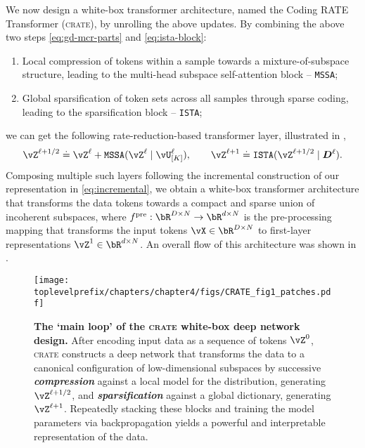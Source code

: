 \documentclass[../../book-main.tex]{subfiles}
\begin{document}
We now design a white-box transformer architecture, named the Coding RATE Transformer (\textsc{crate}), by unrolling the above updates. By combining the above two steps \eqref{eq:gd-mcr-parts} and \eqref{eq:ista-block}:
\begin{enumerate}[leftmargin=0.7cm]
    \item Local compression of tokens within a sample towards a mixture-of-subspace structure, leading to the multi-head subspace self-attention block -- \texttt{MSSA};
    \item Global sparsification of token sets across all samples through sparse coding, leading to the sparsification block -- \texttt{ISTA};
\end{enumerate}
we can get the following rate-reduction-based transformer layer, illustrated in , 
\begin{equation}
    \vZ^{\ell+1/2} \doteq \vZ^{\ell} + \texttt{MSSA}(\vZ^{\ell} \mid \vU_{[K]}^{\ell}), 
    \qquad 
    \vZ^{\ell+1}\doteq \texttt{ISTA}(\vZ^{\ell+1/2} \mid \bm D^\ell).
\end{equation}
Composing multiple such layers following the incremental construction of our representation in \eqref{eq:incremental}, we obtain a white-box transformer architecture that transforms the data tokens towards a compact and sparse union of incoherent subspaces, where $f^{\pre}: \bR^{D \times N} \rightarrow \bR^{d \times N}$ is the pre-processing mapping that transforms the input tokens $\vX \in \bR^{D \times N}$ to first-layer representations $\vZ^{1} \in \bR^{d \times N}$. An overall flow of this architecture was shown in .

\begin{figure}[t!]
     \centering
         \texttt{[image: \\toplevelprefix/chapters/chapter4/figs/CRATE\_fig1\_patches.pdf]}
     \vspace{-0.1in}
     \caption{
     \textbf{The `main loop' of the \textsc{crate} white-box deep network design.} 
     After encoding input data as a sequence of tokens $\vZ^0$, \textsc{crate} constructs a deep network that transforms the data to a canonical configuration of low-dimensional subspaces by successive   {\textit{\textbf{compression}}} 
     against a local model for the distribution, generating $\vZ^{\ell+1/2}$, and      {\textit{\textbf{sparsification}}} 
     against a global dictionary, generating $\vZ^{\ell+1}$. 
     Repeatedly stacking these blocks and training the model parameters via backpropagation yields a powerful and interpretable representation of the data.
     }
        \label{fig:crate-diagram}
\end{figure}
\end{document}

